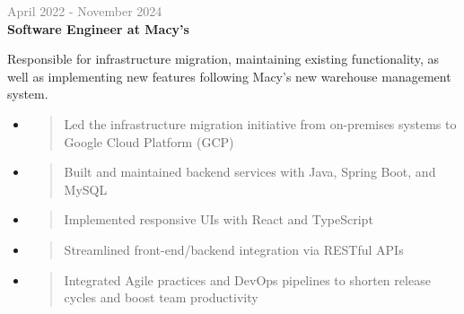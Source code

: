 \documentclass[letterpage]{article}
\begin{document}
\begin{minipage}[t]{0.61\linewidth}
\vspace{7px}
\textcolor{gray}{April 2022 - November 2024}\\
\textbf{\textsf{Software Engineer at Macy's}}\\
\raggedright
Responsible for infrastructure migration, maintaining existing functionality, as
well as implementing new features following Macy's new warehouse management system.
\begin{itemize}[leftmargin=*,labelindent=1mm,labelsep=0mm]
\item
  \begin{quote}
  \raggedright
  Led the infrastructure migration initiative from on-premises systems to Google Cloud Platform (GCP)
  \end{quote}
\item
  \begin{quote}
  \raggedright
  Built and maintained backend services with Java, Spring Boot, and MySQL 
  \end{quote}
\item
  \begin{quote}
  \raggedright
  Implemented responsive UIs with React and TypeScript
  \end{quote}
\item
  \begin{quote}
  \raggedright
  Streamlined front-end/backend integration via RESTful APIs
  \end{quote}
\item
  \begin{quote}
  \raggedright
  Integrated Agile practices and DevOps pipelines to shorten release cycles and boost team productivity
  \end{quote}
\end{itemize}



\end{minipage}
\end{document}
